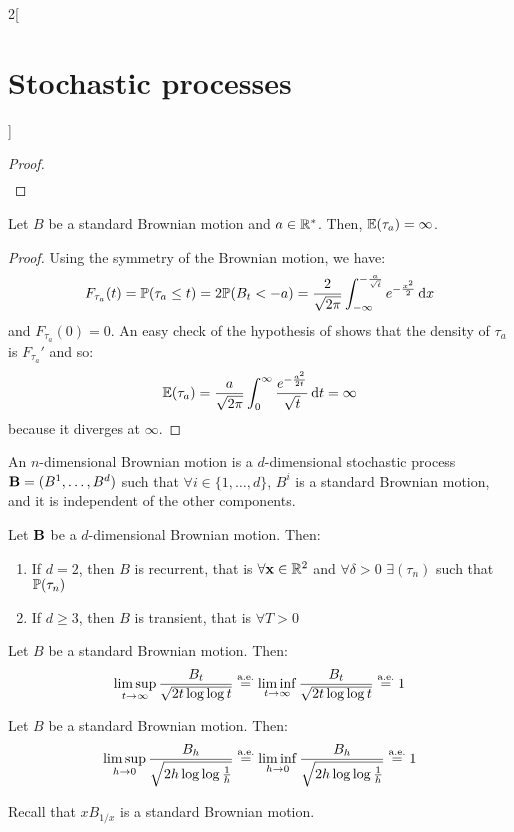 \documentclass[../../../main_math.tex]{subfiles}
\begin{document}
\begin{multicols}{2}[\section{Stochastic processes}]
\begin{proof}
\begin{multline*}
    \end{multline*}
  \end{proof}
  \begin{proposition}
    Let $B$ be a standard Brownian motion and $a\in\mathbb{R}^*$. Then, $\mathbb{E}(\tau_a)=\infty$. 
  \end{proposition}
\begin{proof}
  Using the symmetry of the Brownian motion, we have:
    $$
      F_{\tau_a}(t)=\mathbb{P}(\tau_a\leq t) =2\mathbb{P}(B_t<-a) =\frac{2}{\sqrt{2\pi}}\int_{-\infty}^{-\frac{a}{\sqrt{t}}} e^{-\frac{x^2}{2}}\dd{x}
    $$
    and $F_{\tau_a}(0)=0$. An easy check of the hypothesis of  shows that the density of $\tau_a$ is ${F_{\tau_a}}'$ and so:
    $$
      \mathbb{E}(\tau_a)=\frac{a}{\sqrt{2\pi}}\int_{0}^{\infty} \frac{e^{-\frac{a^2}{2t}}}{\sqrt{t}}\dd{t}=\infty
    $$
    because it diverges at $\infty$.
\end{proof}
\begin{definition}
  An $n$-dimensional Brownian motion is a $d$-dimensional stochastic process $\boldsymbol{\mathrm{B}}=(B^1,\dots,B^d)$ such that $\forall i\in\{1,\dots,d\}$, $B^i$ is a standard Brownian motion, and it is independent of the other components.
\end{definition}
\begin{theorem}
  Let $\boldsymbol{\mathrm{B}}$ be a $d$-dimensional Brownian motion. Then:
  \begin{enumerate}
    \item If $d=2$, then $B$ is recurrent, that is $\forall \boldsymbol{\mathrm{x}}\in\mathbb{R}^2$ and $\forall \delta>0$ $\exists (\tau_n)$ such that $\mathbb{P}(\tau_n)$
    \item If $d\geq 3$, then $B$ is transient, that is $\forall T>0$
  \end{enumerate}
\end{theorem}
\begin{theorem}
  Let $B$ be a standard Brownian motion. Then:
  $$
    \limsup_{t\to\infty}\frac{B_t}{\sqrt{2t\log\log t}}\overset{\text{a.e.}}{=}\liminf_{t\to\infty}\frac{B_t}{\sqrt{2t\log\log t}}\overset{\text{a.e.}}{=}1
  $$
\end{theorem}
\begin{corollary}
  Let $B$ be a standard Brownian motion. Then:
  $$
    \limsup_{h\to 0} \frac{B_h}{\sqrt{2h\log\log\frac{1}{h}}}\overset{\text{a.e.}}{=}\liminf_{h\to 0} \frac{B_h}{\sqrt{2h\log\log\frac{1}{h}}}\overset{\text{a.e.}}{=}1
  $$
\end{corollary}
\begin{sproof}
  Recall that $xB_{1/x}$ is a standard Brownian motion.

\end{sproof}
\end{multicols}
\end{document}
